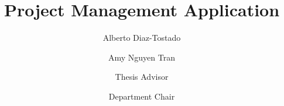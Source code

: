 \documentclass{scu-thesis}
\author{Alberto Diaz-Tostado}
\author{Amy Nguyen Tran}
\title{Project Management Application}
\begin{document}
\frontmatter
\signature{Thesis Advisor}
\signature{Department Chair}

\maketitle


\tableofcontents
\listoffigures

\mainmatter





\backmatter
\immediate{}
\end{document}
